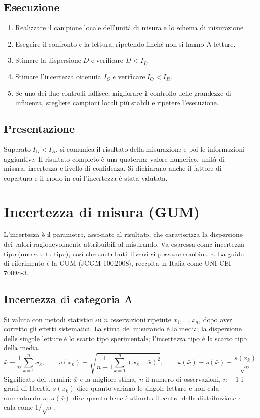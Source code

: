 \documentclass[11pt,a4paper]{article}
\begin{document}
\subsection*{Esecuzione}
\begin{enumerate}
\item Realizzare il campione locale dell'unità di misura e lo schema di misurazione.
\item Eseguire il confronto e la lettura, ripetendo finché non si hanno $N$ letture.
\item Stimare la dispersione $D$ e verificare $D < I_R$.
\item Stimare l'incertezza ottenuta $I_O$ e verificare $I_O < I_R$.
\item Se uno dei due controlli fallisce, migliorare il controllo delle grandezze di influenza, scegliere campioni locali più stabili e ripetere l'esecuzione.
\end{enumerate}

\subsection*{Presentazione}
Superato $I_O < I_R$, si comunica il risultato della misurazione e poi le informazioni aggiuntive. Il risultato completo è una quaterna: valore numerico, unità di misura, incertezza e livello di confidenza. Si dichiarano anche il fattore di copertura e il modo in cui l'incertezza è stata valutata.

\section*{Incertezza di misura (GUM)}

L'incertezza è il parametro, associato al risultato, che caratterizza la dispersione dei valori ragionevolmente attribuibili al misurando. Va espressa come incertezza tipo (uno scarto tipo), così che contributi diversi si possano combinare. La guida di riferimento è la GUM (JCGM 100:2008), recepita in Italia come UNI CEI 70098-3.

\subsection*{Incertezza di categoria A}

Si valuta con metodi statistici su $n$ osservazioni ripetute $x_1,\dots,x_n$, dopo aver corretto gli effetti sistematici. La stima del misurando è la media; la dispersione delle singole letture è lo scarto tipo sperimentale; l'incertezza tipo è lo scarto tipo della media.
\[
\bar{x} = \frac{1}{n}\sum_{k=1}^{n} x_k, \qquad s(x_k) = \sqrt{\frac{1}{n-1}\sum_{k=1}^{n}\left(x_k - \bar{x}\right)^2}, \qquad u(\bar{x}) = s(\bar{x}) = \frac{s(x_k)}{\sqrt{n}}
\]
Significato dei termini: $\bar{x}$ è la migliore stima, $n$ il numero di osservazioni, $n-1$ i gradi di libertà. $s(x_k)$ dice quanto variano le singole letture e non cala aumentando $n$; $u(\bar{x})$ dice quanto bene è stimato il centro della distribuzione e cala come $1/\sqrt{n}$.
\end{document}

